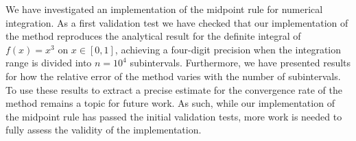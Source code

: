 \documentclass[english,notitlepage,reprint,nofootinbib]{revtex4-1}  %
\begin{document}
	We have investigated an implementation of the midpoint rule for numerical integration. As a first validation test we have checked that our implementation of the method reproduces the analytical result for the definite integral of $f(x) = x^3$ on $x \in [0,1]$, achieving a four-digit precision when the integration range is divided into $n=10^4$ subintervals. Furthermore, we have presented results for how the relative error of the method varies with the number of subintervals. To use these results to extract a precise estimate for the convergence rate of the method remains a topic for future work. As such, while our implementation of the midpoint rule has passed the initial validation tests, more work is needed to fully assess the validity of the implementation.
	
	\onecolumngrid
	
	
	
	
\end{document}
